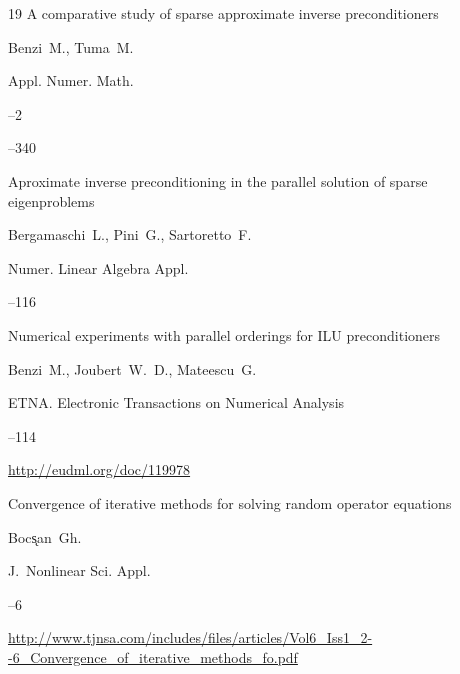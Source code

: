 \begin{thebibliography}{19}
\paper A comparative study of sparse approximate inverse preconditioners

\by Benzi~M., Tuma~M.

\jour Appl. Numer. Math.



--2

--340





\paper Aproximate inverse preconditioning in the parallel solution of sparse eigenproblems

\by Bergamaschi~L., Pini~G., Sartoretto~F.

\jour Numer. Linear Algebra Appl.




--116




\paper Numerical experiments with parallel orderings for ILU preconditioners

\by Benzi~M., Joubert~W.~D., Mateescu~G.

\jour ETNA. Electronic Transactions on Numerical Analysis



--114

\elink \url{http://eudml.org/doc/119978}




\paper Convergence of iterative methods for solving random operator equations

\by Boc\k{s}an~Gh.

\jour J.~Nonlinear Sci. Appl.




--6

\elink \url{http://www.tjnsa.com/includes/files/articles/Vol6_Iss1_2--6_Convergence_of_iterative_methods_fo.pdf}





\end{thebibliography}
